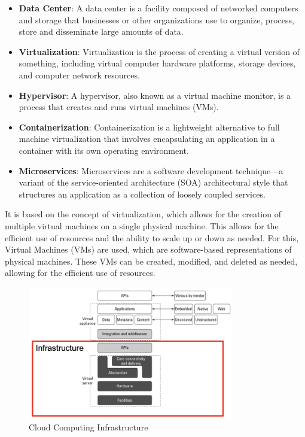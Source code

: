 \begin{itemize}
    \item \textbf{Data Center}: A data center is a facility composed of networked computers and storage that businesses or other organizations use to organize, process, store and disseminate large amounts of data.
    \item \textbf{Virtualization}: Virtualization is the process of creating a virtual version of something, including virtual computer hardware platforms, storage devices, and computer network resources.
    \item \textbf{Hypervisor}: A hypervisor, also known as a virtual machine monitor, is a process that creates and runs virtual machines (VMs).
    \item \textbf{Containerization}: Containerization is a lightweight alternative to full machine virtualization that involves encapsulating an application in a container with its own operating environment.
    \item \textbf{Microservices}: Microservices are a software development technique—a variant of the service-oriented architecture (SOA) architectural style that structures an application as a collection of loosely coupled services.
\end{itemize}

It is based on the concept of virtualization, which allows for the creation of multiple virtual machines on a single physical machine. This allows for the efficient use of resources and the ability to scale up or down as needed. For this, Virtual Machines (VMs) are used, which are software-based representations of physical machines. These VMs can be created, modified, and deleted as needed, allowing for the efficient use of resources.

\begin{figure}[H]
    \centering
    \includegraphics[width=0.8\textwidth]{assets/fig14.png}
    \caption{Cloud Computing Infrastructure}
    \label{fig:cloud-computing-infrastructure}
\end{figure}

